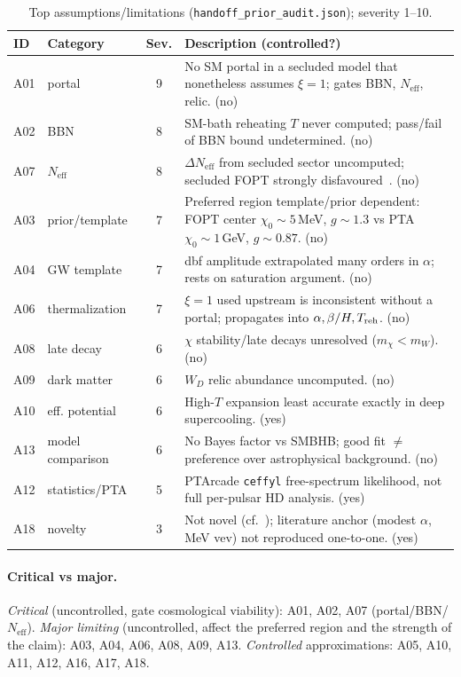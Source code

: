 \documentclass[11pt]{article}
\newcommand{\Neff}{N_{\mathrm{eff}}}
\newcommand{\chizero}{\chi_0}
\begin{document}
\begin{table}[h]
\centering
\small
\begin{tabular}{@{}llcp{6.6cm}@{}}
\toprule
ID & Category & Sev. & Description (controlled?) \\
\midrule
A01 & portal & 9 & No SM portal in a secluded model that nonetheless assumes $\xi=1$; gates BBN, $\Neff$, relic. (no) \\
A02 & BBN & 8 & SM-bath reheating $T$ never computed; pass/fail of BBN bound undetermined. (no) \\
A07 & $\Neff$ & 8 & $\Delta\Neff$ from secluded sector uncomputed; secluded FOPT strongly disfavoured~\cite{Bringmann2023}. (no) \\
A03 & prior/template & 7 & Preferred region template/prior dependent: FOPT center $\chizero\!\sim\!5$\,MeV, $g\!\sim\!1.3$ vs PTA $\chizero\!\sim\!1$\,GeV, $g\!\sim\!0.87$. (no) \\
A04 & GW template & 7 & dbf amplitude extrapolated many orders in $\alpha$; rests on saturation argument. (no) \\
A06 & thermalization & 7 & $\xi=1$ used upstream is inconsistent without a portal; propagates into $\alpha,\beta/H,T_{\rm reh}$. (no) \\
A08 & late decay & 6 & $\chi$ stability/late decays unresolved ($m_\chi<m_W$). (no) \\
A09 & dark matter & 6 & $W_D$ relic abundance uncomputed. (no) \\
A10 & eff. potential & 6 & High-$T$ expansion least accurate exactly in deep supercooling. (yes) \\
A13 & model comparison & 6 & No Bayes factor vs SMBHB; good fit $\neq$ preference over astrophysical background. (no) \\
A12 & statistics/PTA & 5 & PTArcade \texttt{ceffyl} free-spectrum likelihood, not full per-pulsar HD analysis. (yes) \\
A18 & novelty & 3 & Not novel (cf.~\cite{Borah2021}); literature anchor (modest $\alpha$, MeV vev) not reproduced one-to-one. (yes) \\
\bottomrule
\end{tabular}
\caption{Top assumptions/limitations (\texttt{handoff\_prior\_audit.json}); severity 1--10.}
\label{tab:assump}
\end{table}

\paragraph{Critical vs major.} \emph{Critical} (uncontrolled, gate cosmological viability): A01, A02,
A07 (portal/BBN/$\Neff$). \emph{Major limiting} (uncontrolled, affect the preferred region and the
strength of the claim): A03, A04, A06, A08, A09, A13. \emph{Controlled} approximations: A05, A10, A11,
A12, A16, A17, A18.
\end{document}

